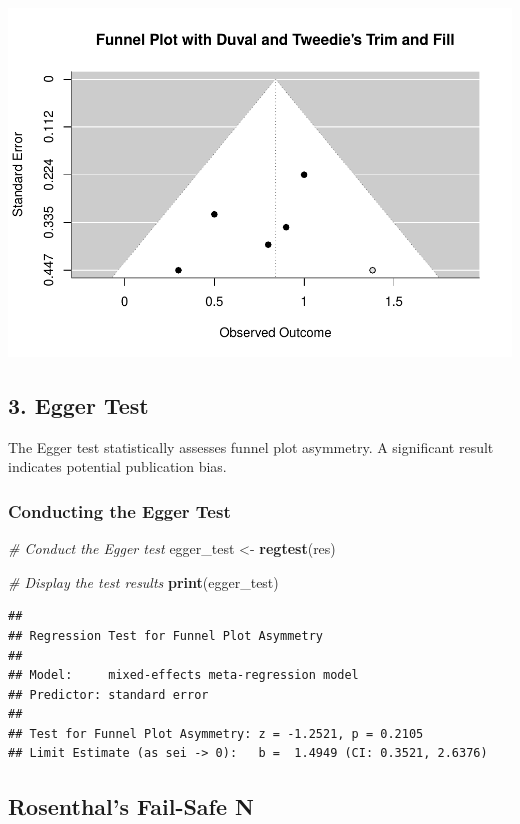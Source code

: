 \documentclass[
]{book}
\newenvironment{Shaded}{\begin{snugshade}}{\end{snugshade}}
\newcommand{\CommentTok}[1]{\textcolor[rgb]{0.56,0.35,0.01}{\textit{#1}}}
\newcommand{\FunctionTok}[1]{\textcolor[rgb]{0.13,0.29,0.53}{\textbf{#1}}}
\newcommand{\NormalTok}[1]{#1}
\newcommand{\OtherTok}[1]{\textcolor[rgb]{0.56,0.35,0.01}{#1}}
\begin{document}
\includegraphics{_main_files/figure-latex/unnamed-chunk-34-1.pdf}

\subsection{3. Egger Test}\label{egger-test}

The Egger test statistically assesses funnel plot asymmetry. A significant result indicates potential publication bias.

\subsubsection{Conducting the Egger Test}\label{conducting-the-egger-test}

\begin{Shaded}
\begin{Highlighting}[]
\CommentTok{\# Conduct the Egger test}
\NormalTok{egger\_test }\OtherTok{\textless{}{-}} \FunctionTok{regtest}\NormalTok{(res)}

\CommentTok{\# Display the test results}
\FunctionTok{print}\NormalTok{(egger\_test)}
\end{Highlighting}
\end{Shaded}

\begin{verbatim}
## 
## Regression Test for Funnel Plot Asymmetry
## 
## Model:     mixed-effects meta-regression model
## Predictor: standard error
## 
## Test for Funnel Plot Asymmetry: z = -1.2521, p = 0.2105
## Limit Estimate (as sei -> 0):   b =  1.4949 (CI: 0.3521, 2.6376)
\end{verbatim}

\subsection{Rosenthal's Fail-Safe N}\label{rosenthals-fail-safe-n}
\end{document}
